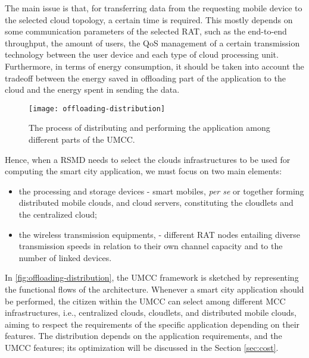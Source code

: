 \documentclass[twoside,openright]{report}
\begin{document}
The main issue is that, for transferring data from the requesting mobile device to the selected cloud topology, a certain time is required. 
This mostly depends on some communication parameters of the selected \gls{RAT}, such as the end-to-end throughput, the amount of users, the \gls{QoS} management of a certain transmission technology between the user device and each type of cloud processing unit. 
Furthermore, in terms of energy consumption, it should be taken into account the tradeoff between the energy saved in offloading part of the application to the cloud and the energy spent in sending the data. 

\begin{figure}[tbp]
\centering
\texttt{[image: offloading-distribution]}
\caption{The process of distributing and performing the application among
different parts of the UMCC.}
\label{fig:offloading-distribution}
\end{figure}

Hence, when a \gls{RSMD} needs to select the clouds infrastructures to be used for computing the smart city application, we must focus on two main elements: 
\begin{itemize}
\item{the processing and storage devices - smart mobiles, \textit{per se} or together forming distributed mobile clouds, and cloud servers, constituting the cloudlets and the centralized cloud;}
\item{the wireless transmission equipments, - different \gls{RAT} nodes entailing diverse transmission speeds in relation to their own channel capacity and to the number of linked devices.} 
\end{itemize}

In \autoref{fig:offloading-distribution}, the  \gls{UMCC} framework is sketched by representing the functional flows of the architecture. Whenever a smart city application should be performed, the citizen within the \gls{UMCC} can select among different \gls{MCC} infrastructures, i.e., centralized clouds, cloudlets, and distributed mobile clouds, aiming to respect the requirements of the specific application depending on their features. 
The distribution depends on the application requirements, and the \gls{UMCC} features; its optimization will be discussed in the Section \ref{sec:cost}.
\end{document}
